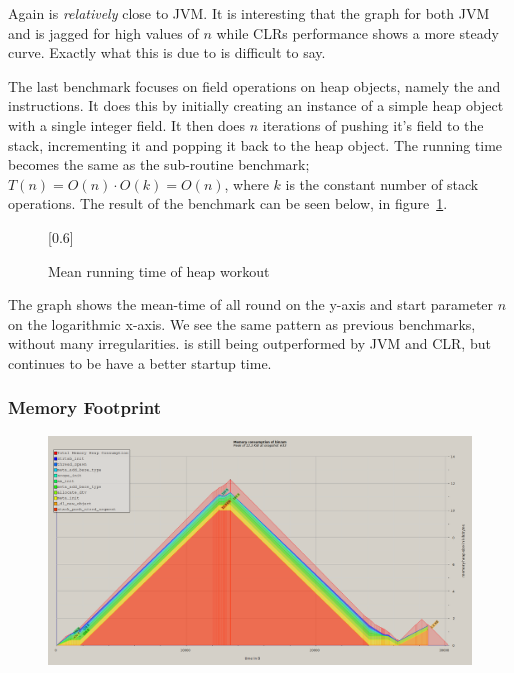 Again \thename{} is \emph{relatively} close to JVM. It is interesting that the
graph for both JVM and \thename{} is jagged for high values of $n$ while CLRs
performance shows a more steady curve. Exactly what this is due to is difficult
to say.


The last benchmark focuses on field operations on heap objects, namely the
 and  instructions. It does
this by initially creating an instance of a simple heap object with a single
integer field. It then does $n$ iterations of pushing it's field to the stack,
incrementing it and popping it back to the heap object. The running time becomes
the same as the sub-routine benchmark; $T(n) = O(n) \cdot O(k) = O(n)$, where
$k$ is the constant number of stack operations. The result of the
benchmark can be seen below, in figure~\ref{fig:eval:benchmark:heap}.

\begin{figure}[H]
  \centering
  \scalebox{0.8}[0.6]{}
  \caption{Mean running time of heap workout}
\label{fig:eval:benchmark:heap}
\end{figure}

The graph shows the mean-time of all round on the y-axis and start parameter $n$
on the logarithmic x-axis. We see the same pattern as previous benchmarks,
without many irregularities. \thename{} is still being outperformed by JVM and
CLR, but continues to be have a better startup time.


\subsubsection{Memory Footprint}

\begin{figure}[H]
  \centering
  \includegraphics[scale=0.35]{figures/fig-mem}
\end{figure}

